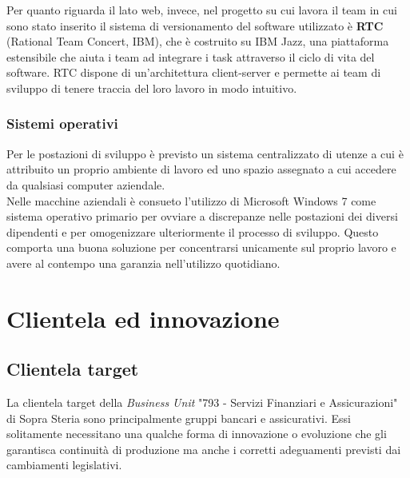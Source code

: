 	Per quanto riguarda il lato web, invece, nel progetto su cui lavora il team in cui sono stato inserito il sistema di versionamento del software utilizzato è \textbf{RTC} (Rational Team Concert, IBM), che è costruito su IBM Jazz, una piattaforma estensibile che aiuta i team ad integrare i task attraverso il ciclo di vita del software. RTC dispone di un'architettura client-server e permette ai team di sviluppo di tenere traccia del loro lavoro in modo intuitivo.
	
	\subsubsection{Sistemi operativi}
	
	Per le postazioni di sviluppo è previsto un sistema centralizzato di utenze a cui è attribuito un proprio ambiente di lavoro ed uno spazio assegnato a cui accedere da qualsiasi computer aziendale.\\
	
	Nelle macchine aziendali è consueto l'utilizzo di Microsoft Windows 7 come sistema operativo primario per ovviare a discrepanze nelle postazioni dei diversi dipendenti e per omogenizzare ulteriormente il processo di sviluppo. Questo comporta una buona soluzione per concentrarsi unicamente sul proprio lavoro e avere al contempo una garanzia nell'utilizzo quotidiano.
	

\section{Clientela ed innovazione}

	\subsection{Clientela target}
	
	La clientela target della \textit{Business Unit} "793 - Servizi Finanziari e Assicurazioni" di Sopra Steria sono principalmente gruppi bancari e assicurativi. Essi solitamente necessitano una qualche forma di innovazione o evoluzione che gli garantisca continuità di produzione ma anche i corretti adeguamenti previsti dai cambiamenti legislativi.\\
	
